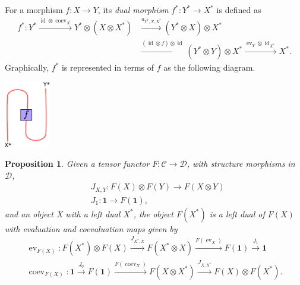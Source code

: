 \documentclass[11pt]{book}
\newtheorem{Prop}[theorem]{Proposition}
\theoremstyle{Rem}
\theoremstyle{definition}
\numberwithin{equation}{section}
\newcommand\id{\operatorname{id}}
\newcommand\C{\mathcal C}
\newcommand\D{\mathcal D}
\newcommand\one{\mathbf{1}}
\newcommand\ev{\operatorname{ev}}
\newcommand\coev{\operatorname{coev}}
\begin{document}
For a morphism $f:X\rightarrow Y$, its \textit{dual morphism} $f^*: Y^* \rightarrow X^*$ is defined as \begin{align}
	f^*:Y^*\xrightarrow{\id\otimes \coev_X} Y^* \otimes (X\otimes X^*) &\xrightarrow{a_{Y^*, X, X^*}} (Y^* \otimes X)\otimes X^* \nonumber \\ &\xrightarrow {(\id \otimes f) \otimes \id} (Y^* \otimes Y) \otimes X^* \xrightarrow{\ev_Y \otimes \id_{X^*}} X^*.
\end{align}
Graphically, $f^*$ is represented in terms of $f$ as the following diagram.
\begin{center}
\includegraphics[width=0.15\textwidth]{fdual.eps}
\end{center}
\begin{Prop}
Given a tensor functor $F:\C \rightarrow \D$, with structure morphisms in $\D$, \begin{align}
	&J_{X,Y} : F(X) \otimes F(Y) \rightarrow F(X\otimes Y)\\
	&J_1 : \one \rightarrow F(\one),
\end{align}
and an object X with a left dual $X^*$, the object $F(X^*)$ is a left dual of $F(X)$ with evaluation and coevaluation maps given by
\begin{align}
	\ev_{F(X)}: F(X^*)\otimes F(X) \xrightarrow{J_{X^*, X}} F(X^*\otimes X) \xrightarrow{F(\ev_X)}F(\one) \xrightarrow{J_1} \one\\
	\coev_{F(X)}: \one \xrightarrow{J_0} F(\one) \xrightarrow{F(\coev_X)} F(X\otimes X^*) \xrightarrow{J_{X, X^*}} F(X) \otimes F(X^*).
\end{align}
\end{Prop}
\end{document}
